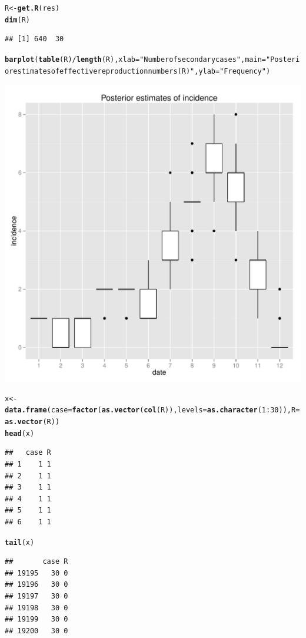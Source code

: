 \documentclass{article}\usepackage[]{graphicx}\usepackage[]{color}
\makeatletter
\newcommand{\hlnum}[1]{\textcolor[rgb]{0.686,0.059,0.569}{#1}}%
\newcommand{\hlstr}[1]{\textcolor[rgb]{0.192,0.494,0.8}{#1}}%
\newcommand{\hlopt}[1]{\textcolor[rgb]{0,0,0}{#1}}%
\newcommand{\hlstd}[1]{\textcolor[rgb]{0.345,0.345,0.345}{#1}}%
\newcommand{\hlkwb}[1]{\textcolor[rgb]{0.69,0.353,0.396}{#1}}%
\newcommand{\hlkwc}[1]{\textcolor[rgb]{0.333,0.667,0.333}{#1}}%
\newcommand{\hlkwd}[1]{\textcolor[rgb]{0.737,0.353,0.396}{\textbf{#1}}}%
\newenvironment{kframe}{%
 \def\at@end@of@kframe{}%
 \ifinner\ifhmode%
  \def\at@end@of@kframe{\end{minipage}}%
  \begin{minipage}{\columnwidth}%
 \fi\fi%
 \def\FrameCommand##1{\hskip\@totalleftmargin \hskip-\fboxsep
 \colorbox{shadecolor}{##1}\hskip-\fboxsep
     \hskip-\linewidth \hskip-\@totalleftmargin \hskip\columnwidth}%
 \MakeFramed {\advance\hsize-\width
   \@totalleftmargin\z@ \linewidth\hsize
   \@setminipage}}%
 {\par\unskip\endMakeFramed%
 \at@end@of@kframe}
\newenvironment{knitrout}{}{} %
\makeatother
\begin{document}
\begin{knitrout}
\color{fgcolor}\begin{kframe}
\begin{alltt}
\hlstd{R} \hlkwb{<-} \hlkwd{get.R}\hlstd{(res)}
\hlkwd{dim}\hlstd{(R)}
\end{alltt}
\begin{verbatim}
## [1] 640  30
\end{verbatim}
\begin{alltt}
\hlkwd{barplot}\hlstd{(}\hlkwd{table}\hlstd{(R)}\hlopt{/}\hlkwd{length}\hlstd{(R),} \hlkwc{xlab}\hlstd{=}\hlstr{"Number of secondary cases"}\hlstd{,} \hlkwc{main}\hlstd{=}\hlstr{"Posterior estimates of effective reproduction numbers (R)"}\hlstd{,} \hlkwc{ylab}\hlstd{=}\hlstr{"Frequency"}\hlstd{)}
\end{alltt}
\end{kframe}

{\centering \includegraphics[width=.6\textwidth]{figs/unnamed-chunk-48} 

}



\end{knitrout}


\begin{knitrout}
\color{fgcolor}\begin{kframe}
\begin{alltt}
\hlstd{x} \hlkwb{<-} \hlkwd{data.frame}\hlstd{(}\hlkwc{case}\hlstd{=}\hlkwd{factor}\hlstd{(}\hlkwd{as.vector}\hlstd{(}\hlkwd{col}\hlstd{(R)),} \hlkwc{levels}\hlstd{=}\hlkwd{as.character}\hlstd{(}\hlnum{1}\hlopt{:}\hlnum{30}\hlstd{)),}\hlkwc{R}\hlstd{=}\hlkwd{as.vector}\hlstd{(R))}
\hlkwd{head}\hlstd{(x)}
\end{alltt}
\begin{verbatim}
##   case R
## 1    1 1
## 2    1 1
## 3    1 1
## 4    1 1
## 5    1 1
## 6    1 1
\end{verbatim}
\begin{alltt}
\hlkwd{tail}\hlstd{(x)}
\end{alltt}
\begin{verbatim}
##       case R
## 19195   30 0
## 19196   30 0
## 19197   30 0
## 19198   30 0
## 19199   30 0
## 19200   30 0
\end{verbatim}
\end{kframe}
\end{knitrout}
\end{document}
